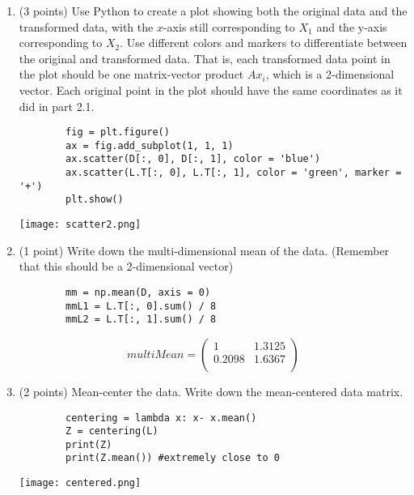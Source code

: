 \documentclass[11pt]{article}
\begin{document}
\begin{enumerate}
\begin{enumerate}
        \item (3 points) Use Python to create a plot showing both the original
        data and the transformed data, with the $x$-axis still corresponding to
        $X_1$ and the y-axis corresponding to $X_2$. Use different colors and
        markers to differentiate between the original and transformed data. That
        is, each transformed data point in the plot should be one matrix-vector
        product $Ax_i$, which is a 2-dimensional vector. Each original point in
        the plot should have the same coordinates as it did in part 2.1.
        \newline \begin{lstlisting}
        fig = plt.figure()
        ax = fig.add_subplot(1, 1, 1)
        ax.scatter(D[:, 0], D[:, 1], color = 'blue')
        ax.scatter(L.T[:, 0], L.T[:, 1], color = 'green', marker = '+')
        plt.show()
        \end{lstlisting}
        \newline \texttt{[image: scatter2.png]}
        \item (1 point) Write down the multi-dimensional mean of the data.
        (Remember that this should be a 2-dimensional vector)
        \newline \begin{lstlisting}
        mm = np.mean(D, axis = 0)
        mmL1 = L.T[:, 0].sum() / 8
        mmL2 = L.T[:, 1].sum() / 8
        \end{lstlisting}
        \newline $$ multi Mean = \begin{pmatrix}
        1 & 1.3125 \\
        0.2098 & 1.6367 \\
        \end{pmatrix}$$
        \newpage
        \item (2 points) Mean-center the data. Write down the mean-centered data
        matrix.
        \newline \begin{lstlisting}
        centering = lambda x: x- x.mean()
        Z = centering(L)
        print(Z)
        print(Z.mean()) #extremely close to 0
        \end{lstlisting}
        \newline \texttt{[image: centered.png]}


\end{enumerate}
\end{enumerate}
\end{document}
